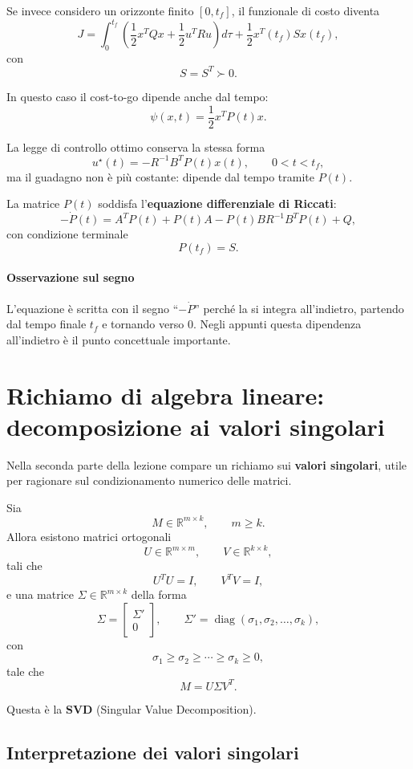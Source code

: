 Se invece considero un orizzonte finito \([0,t_f]\), il funzionale di costo diventa
\[
J=
\int_0^{t_f}
\left(
\frac12 x^TQx+\frac12 u^TRu
\right)d\tau
+
\frac12 x^T(t_f)Sx(t_f),
\]
con
\[
S=S^T\succ 0.
\]

In questo caso il cost-to-go dipende anche dal tempo:
\[
\psi(x,t)=\frac12 x^T P(t)x.
\]

La legge di controllo ottimo conserva la stessa forma
\[
\boxed{
u^\star(t)=-R^{-1}B^TP(t)x(t),
\qquad 0<t<t_f,
}
\]
ma il guadagno non è più costante: dipende dal tempo tramite \(P(t)\).

La matrice \(P(t)\) soddisfa l'\textbf{equazione differenziale di Riccati}:
\[
\boxed{
-\dot P(t)=A^TP(t)+P(t)A-P(t)BR^{-1}B^TP(t)+Q,
}
\]
con condizione terminale
\[
\boxed{
P(t_f)=S.
}
\]

\paragraph{Osservazione sul segno}
L'equazione è scritta con il segno ``\(-\dot P\)'' perché la si integra all'indietro, partendo dal tempo finale \(t_f\) e tornando verso \(0\).  
Negli appunti questa dipendenza all'indietro è il punto concettuale importante.

\section{Richiamo di algebra lineare: decomposizione ai valori singolari}

Nella seconda parte della lezione compare un richiamo sui \textbf{valori singolari}, utile per ragionare sul condizionamento numerico delle matrici.

Sia
\[
M\in\mathbb R^{m\times k},
\qquad m\ge k.
\]
Allora esistono matrici ortogonali
\[
U\in\mathbb R^{m\times m},
\qquad
V\in\mathbb R^{k\times k},
\]
tali che
\[
U^TU=I,
\qquad
V^TV=I,
\]
e una matrice \(\Sigma\in\mathbb R^{m\times k}\) della forma
\[
\Sigma=
\begin{bmatrix}
\Sigma'\\
0
\end{bmatrix},
\qquad
\Sigma'=
\operatorname{diag}(\sigma_1,\sigma_2,\dots,\sigma_k),
\]
con
\[
\sigma_1\ge \sigma_2\ge \cdots \ge \sigma_k\ge 0,
\]
tale che
\[
\boxed{
M=U\Sigma V^T.
}
\]

Questa è la \textbf{SVD} (Singular Value Decomposition).

\subsection{Interpretazione dei valori singolari}

